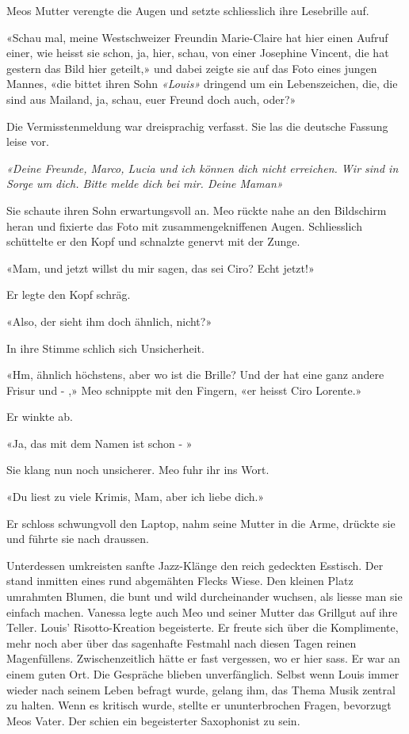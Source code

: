 Meos Mutter verengte die Augen und setzte schliesslich ihre Lesebrille
auf.

«Schau mal, meine Westschweizer Freundin Marie-Claire hat hier einen
Aufruf einer, wie heisst sie schon, ja, hier, schau, von einer Josephine
Vincent, die hat gestern das Bild hier geteilt,» und dabei zeigte sie
auf das Foto eines jungen Mannes, «die bittet ihren Sohn \emph{«Louis»} dringend um ein Lebenszeichen,
die, die sind aus Mailand, ja, schau, euer Freund doch auch, oder?»

Die Vermisstenmeldung war dreisprachig verfasst. Sie las die deutsche Fassung leise vor.

\emph{«Deine Freunde, Marco, Lucia und ich können dich nicht erreichen. Wir
sind in Sorge um dich. Bitte melde dich bei mir. Deine Maman»}

Sie schaute ihren Sohn erwartungsvoll an. Meo rückte nahe an den
Bildschirm heran und fixierte das Foto mit zusammengekniffenen Augen.
Schliesslich schüttelte er den Kopf und schnalzte genervt mit der Zunge.

«Mam, und jetzt willst du mir sagen, das sei Ciro? Echt jetzt!»

Er legte den Kopf schräg.

«Also, der sieht ihm doch ähnlich, nicht?»

In ihre Stimme schlich sich Unsicherheit.

«Hm, ähnlich höchstens, aber wo ist die Brille? Und der hat eine ganz
andere Frisur und - ,» Meo schnippte mit den Fingern, «er heisst Ciro
Lorente.»

Er winkte ab.

«Ja, das mit dem Namen ist schon - »

Sie klang nun noch unsicherer.
Meo fuhr ihr ins Wort.

«Du liest zu viele Krimis, Mam, aber ich liebe dich.»

Er schloss schwungvoll den Laptop, nahm seine Mutter in die Arme,
drückte sie und führte sie nach draussen.

\sectionbreak

Unterdessen umkreisten sanfte Jazz-Klänge den reich gedeckten Esstisch. Der stand inmitten eines rund abgemähten Flecks Wiese. Den kleinen Platz umrahmten Blumen, die bunt und wild durcheinander wuchsen, als liesse man sie einfach machen. 
Vanessa legte auch Meo und seiner Mutter das Grillgut auf ihre Teller. 
Louis’ Risotto-Kreation begeisterte. Er freute sich 
über die Komplimente, mehr noch aber über das sagenhafte Festmahl nach
diesen Tagen reinen Magenfüllens. Zwischenzeitlich hätte er fast
vergessen, wo er hier sass. Er war an einem guten Ort.
Die Gespräche blieben unverfänglich. Selbst wenn Louis immer wieder nach
seinem Leben befragt wurde, gelang ihm, das Thema Musik zentral zu
halten. Wenn es kritisch wurde, stellte er ununterbrochen Fragen, bevorzugt Meos Vater. Der schien ein begeisterter Saxophonist zu sein.

